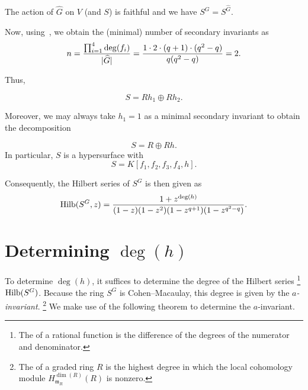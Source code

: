 \documentclass[12pt]{article}
\begin{document}
	The action of $\widehat{G}$ on $V$ (and $S$) is faithful and we have $S^{G} = S^{\widehat{G}}$.

	Now, using~\Cite[Theorem 3.7.1]{DerksenKemper}, we obtain the (minimal) number of secondary invariants as
	\begin{equation*} 
		n = \frac{\prod_{i = 1}^{4} \deg(f_{i})}{{\lvert \widehat{G} \lvert}} = \frac{1 \cdot 2 \cdot (q + 1) \cdot (q^{2} - q)}{q (q^{2} - q)} = 2.
	\end{equation*}

	Thus,
	\begin{tcolorbox}
		\begin{equation*} 
			S = R h_{1} \oplus R h_{2}.
		\end{equation*}
	\end{tcolorbox}

	Moreover, we may always take $h_{1} = 1$ as a minimal secondary invariant to obtain the decomposition
	\begin{tcolorbox}
		\begin{equation*} 
			S = R \oplus R h.
		\end{equation*}
		In particular, $S$ is a hypersurface with
		\begin{equation*} 
			S = K[f_{1}, f_{2}, f_{3}, f_{4}, h].
		\end{equation*}
	\end{tcolorbox}

	Consequently, the Hilbert series of $S^{G}$ is then given as
	\begin{equation*} 
		\operatorname{Hilb}(S^{G}, z) = 
		\frac{1 + z^{\deg(h)}}
		{(1 - z)(1 - z^{2})(1 - z^{q + 1})(1 - z^{q^{2} - q})}.
	\end{equation*}

\section{Determining \texorpdfstring{$\deg(h)$}{deg(h)}}
	
	To determine $\deg(h)$, it suffices to determine the degree of the Hilbert series%
	\footnote{The  of a rational function is the difference of the degrees of the numerator and denominator.} 
	$\operatorname{Hilb}(S^{G})$. 
	Because the ring $S^{G}$ is Cohen--Macaulay, this degree is given by the \emph{$a$-invariant}.%
	\footnote{The  of a graded ring $R$ is the highest degree in which the local cohomology module $H_{\mathfrak{m}_{R}}^{\dim(R)}(R)$ is nonzero.} 
	We make use of the following theorem to determine the $a$-invariant.
\end{document}
